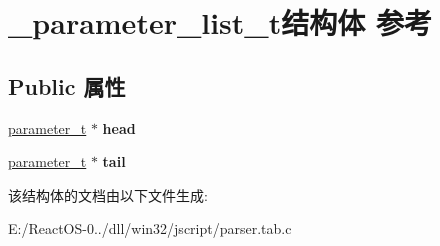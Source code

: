 \hypertarget{struct__parameter__list__t}{}\section{\+\_\+parameter\+\_\+list\+\_\+t结构体 参考}
\label{struct__parameter__list__t}
\subsection*{Public 属性}
\begin{DoxyCompactItemize}
\item 
\mbox{\label{struct__parameter__list__t_a4bce05ac04b4fd1047cab13a2117d10b}} 
\hyperlink{struct__parameter__t}{parameter\+\_\+t} $\ast$ {\bfseries head}
\item 
\mbox{\label{struct__parameter__list__t_ab9b1d93d7e31bce08944cb80f5a72fc7}} 
\hyperlink{struct__parameter__t}{parameter\+\_\+t} $\ast$ {\bfseries tail}
\end{DoxyCompactItemize}


该结构体的文档由以下文件生成\+:\begin{DoxyCompactItemize}
\item 
E\+:/\+React\+O\+S-\/0../dll/win32/jscript/parser.\+tab.\+c\end{DoxyCompactItemize}
